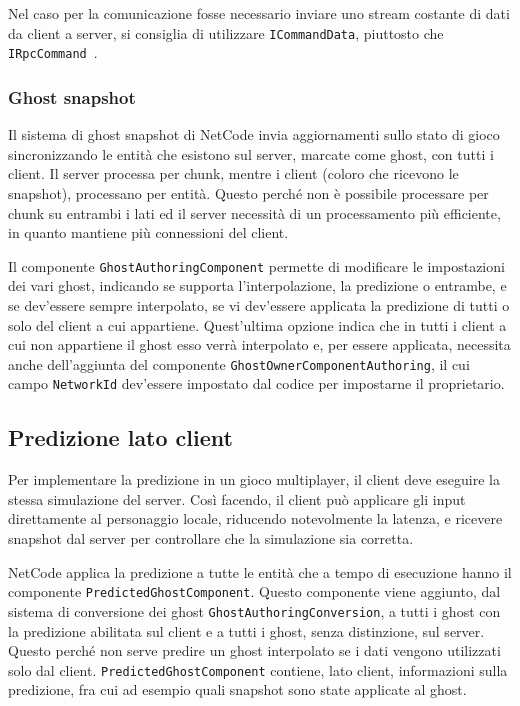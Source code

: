 Nel caso per la comunicazione fosse necessario inviare uno stream costante di dati da client a server, si consiglia di utilizzare \verb|ICommandData|, piuttosto che \verb|IRpcCommand|~\cite{doc:unity-netcode-api}. %

\subsubsection{Ghost snapshot}
Il sistema di ghost snapshot di NetCode invia aggiornamenti sullo stato di gioco sincronizzando le entità che esistono sul server, marcate come ghost, con tutti i client. Il server processa per chunk, mentre i client (coloro che ricevono le snapshot), processano per entità. Questo perché non è possibile processare per chunk su entrambi i lati ed il server necessità di un processamento più efficiente, in quanto mantiene più connessioni del client.

Il componente \verb|GhostAuthoringComponent| permette di modificare le impostazioni dei vari ghost, indicando se supporta l'interpolazione, la predizione o entrambe, e se dev'essere sempre interpolato, se vi dev'essere applicata la predizione di tutti o solo del client a cui appartiene. Quest'ultima opzione indica che in tutti i client a cui non appartiene il ghost esso verrà interpolato e, per essere applicata, necessita anche dell'aggiunta del componente \verb|GhostOwnerComponentAuthoring|, il cui campo \verb|NetworkId| dev'essere impostato dal codice per impostarne il proprietario.

\subsection{Predizione lato client}
Per implementare la predizione in un gioco multiplayer, il client deve eseguire la stessa simulazione del server. Così facendo, il client può applicare gli input direttamente al personaggio locale, riducendo notevolmente la latenza, e ricevere snapshot dal server per controllare che la simulazione sia corretta.

NetCode applica la predizione a tutte le entità che a tempo di esecuzione hanno il componente \verb|PredictedGhostComponent|. Questo componente viene aggiunto, dal sistema di conversione dei ghost \verb|GhostAuthoringConversion|, a tutti i ghost con la predizione abilitata sul client e a tutti i ghost, senza distinzione, sul server. Questo perché non serve predire un ghost interpolato se i dati vengono utilizzati solo dal client.
\verb|PredictedGhostComponent| contiene, lato client, informazioni sulla predizione, fra cui ad esempio quali snapshot sono state applicate al ghost.

